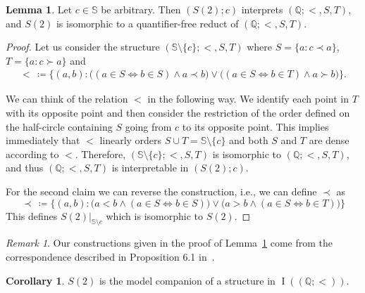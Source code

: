 \documentclass{amsart}
\theoremstyle{definition}
\newtheorem{lemma}[theorem]{Lemma}
\newtheorem{corollary}[theorem]{Corollary}
\theoremstyle{remark}
\newtheorem{remark}[theorem]{Remark}
\numberwithin{equation}{section}
\DeclareMathOperator{\I}{\operatorname{I}}
\newcommand{\cc}{\mathbb{S}}
\begin{document}
\begin{lemma}\label{s2_part}
	Let $c\in \cc$ be arbitrary. Then $(S(2);c)$ interprets $(\mathbb{Q};<,S,T)$, and $S(2)$ is isomorphic to a quantifier-free reduct of $(\mathbb{Q};<,S,T)$.
\end{lemma}

\begin{proof}
	Let us consider the structure $(\cc\setminus \{c\};<,S,T)$ where $S=\{a: c\prec a\}$, $T=\{a: c\succ a\}$ and 
\begin{align*}
<\, \coloneqq \{(a,b): \bigl((a\in S\Leftrightarrow b\in S)\wedge a\prec b\bigr)\vee \bigl((a\in S\Leftrightarrow b\in T)\wedge a\succ b\bigr)\}.
\end{align*}

	We can think of the relation $<$ in the following way. We identify each point in $T$ with its opposite point and then consider the restriction of the order defined on the half-circle containing $S$ going from $c$ to its opposite point. This implies immediately that $<$ linearly orders $S\cup T=\cc\setminus \{c\}$ and both $S$ and $T$ are dense according to $<$. Therefore, $(\cc\setminus \{c\};<,S,T)$ is isomorphic to $(\mathbb{Q};<,S,T)$, and thus $(\mathbb{Q};<,S,T)$ is interpretable in $(S(2);c)$.
	
	For the second claim we can reverse the construction, i.e., we can define $\prec$ as
\[
	\prec\, \coloneqq \{(a,b): \bigl(a<b\wedge (a\in S\Leftrightarrow b\in S)\bigr)\vee \bigl(a>b\wedge (a\in S\Leftrightarrow b\in T)\bigr)\}
\]
This defines $S(2)|_{\cc\setminus c}$ which is isomorphic to $S(2)$.
\end{proof}

\begin{remark}
	Our constructions given in the proof of Lemma~\ref{s2_part} come from the correspondence described in Proposition 6.1 in~\cite{CameronOrbits}. 
\end{remark}

\begin{corollary}\label{companion_s2}
    $S(2)$ is the model companion of a structure in $\I(({\mathbb Q};<))$.
\end{corollary}
\end{document}
